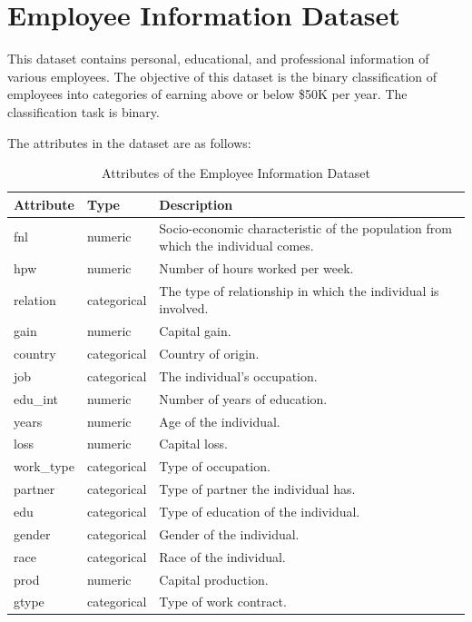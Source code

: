 \documentclass[a4paper,12pt]{article}
\begin{document}
\section{Employee Information Dataset}

This dataset contains personal, educational, and professional information of various employees. The objective of this dataset is the binary classification of employees into categories of earning above or below \$50K per year. The classification task is binary.

The attributes in the dataset are as follows:
\begin{table}[H]
\centering
\caption{Attributes of the Employee Information Dataset}
\begin{tabular}{|l|l|p{10cm}|}
\hline
\textbf{Attribute} & \textbf{Type} & \textbf{Description} \\ \hline
fnl & numeric & Socio-economic characteristic of the population from which the individual comes. \\ \hline
hpw & numeric & Number of hours worked per week. \\ \hline
relation & categorical & The type of relationship in which the individual is involved. \\ \hline
gain & numeric & Capital gain. \\ \hline
country & categorical & Country of origin. \\ \hline
job & categorical & The individual's occupation. \\ \hline
edu\_int & numeric & Number of years of education. \\ \hline
years & numeric & Age of the individual. \\ \hline
loss & numeric & Capital loss. \\ \hline
work\_type & categorical & Type of occupation. \\ \hline
partner & categorical & Type of partner the individual has. \\ \hline
edu & categorical & Type of education of the individual. \\ \hline
gender & categorical & Gender of the individual. \\ \hline
race & categorical & Race of the individual. \\ \hline
prod & numeric & Capital production. \\ \hline
gtype & categorical & Type of work contract. \\ \hline
\end{tabular}
\end{table}
    
\end{document}
